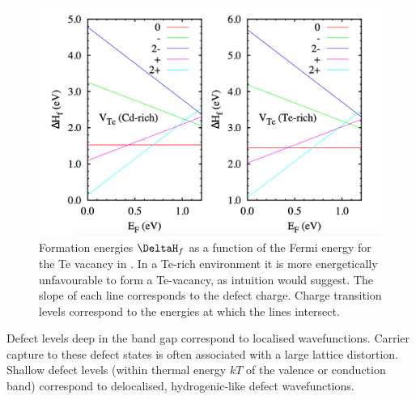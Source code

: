 \begin{figure}[h]
\centering
  \includegraphics[width=1.0*\columnwidth]{figures/ch3/defectenergetics.png}
  \caption[Formation energies for the Te vacancy in CdTe]{Formation energies $\DeltaH_f$ as a function of the Fermi energy for the Te vacancy in . In a Te-rich environment it is more energetically unfavourable to form a Te-vacancy, as intuition would suggest. The slope of each line corresponds to the defect charge. Charge transition levels correspond to the energies at which the lines intersect.}
\end{figure}%

Defect levels deep in the band gap correspond to localised wavefunctions. Carrier capture to these defect states is often associated with a large lattice distortion. Shallow defect levels (within thermal energy $kT$ of the valence or conduction band) correspond to delocalised, hydrogenic-like defect wavefunctions. 



